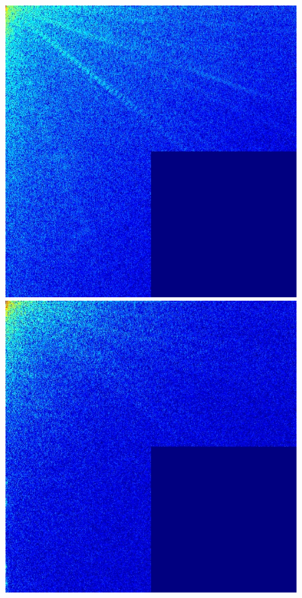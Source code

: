 \documentclass[12pt]{report}
\begin{document}
\begin{figure}[H]
\begin{center}
\includegraphics[scale=0.25]{../ImageRes/dct_masked0_0.jpg} 
\includegraphics[scale=0.25]{../ImageRes/dct_masked0_1.jpg} 

\end{center}
\end{figure}
\end{document}
